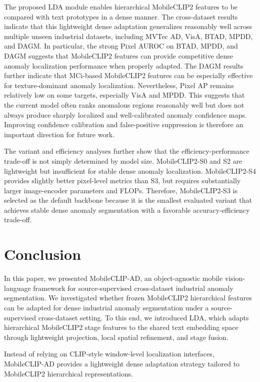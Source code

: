 \documentclass[10pt]{article}
\begin{document}
The proposed LDA module enables hierarchical MobileCLIP2 features to be compared with text prototypes in a dense manner. The cross-dataset results indicate that this lightweight dense adaptation generalizes reasonably well across multiple unseen industrial datasets, including MVTec AD, VisA, BTAD, MPDD, and DAGM. In particular, the strong Pixel AUROC on BTAD, MPDD, and DAGM suggests that MobileCLIP2 features can provide competitive dense anomaly localization performance when properly adapted. The DAGM results further indicate that MCi-based MobileCLIP2 features can be especially effective for texture-dominant anomaly localization. Nevertheless, Pixel AP remains relatively low on some targets, especially VisA and MPDD. This suggests that the current model often ranks anomalous regions reasonably well but does not always produce sharply localized and well-calibrated anomaly confidence maps. Improving confidence calibration and false-positive suppression is therefore an important direction for future work.

The variant and efficiency analyses further show that the efficiency-performance trade-off is not simply determined by model size. MobileCLIP2-S0 and S2 are lightweight but insufficient for stable dense anomaly localization. MobileCLIP2-S4 provides slightly better pixel-level metrics than S3, but requires substantially larger image-encoder parameters and FLOPs. Therefore, MobileCLIP2-S3 is selected as the default backbone because it is the smallest evaluated variant that achieves stable dense anomaly segmentation with a favorable accuracy-efficiency trade-off.


\section{Conclusion}

In this paper, we presented MobileCLIP-AD, an object-agnostic mobile vision-language framework for source-supervised cross-dataset industrial anomaly segmentation. We investigated whether frozen MobileCLIP2 hierarchical features can be adapted for dense industrial anomaly segmentation under a source-supervised cross-dataset setting. To this end, we introduced LDA, which adapts hierarchical MobileCLIP2 stage features to the shared text embedding space through lightweight projection, local spatial refinement, and stage fusion.

Instead of relying on CLIP-style window-level localization interfaces, MobileCLIP-AD provides a lightweight dense adaptation strategy tailored to MobileCLIP2 hierarchical representations.
\end{document}

